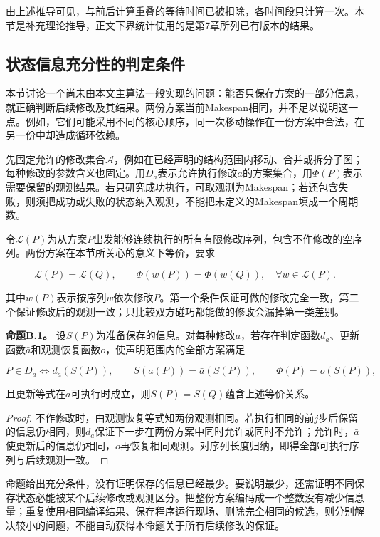 \documentclass[anonymous,notoc]{gmcm2026}
\begin{document}
由上述推导可见，与前后计算重叠的等待时间已被扣除，各时间段只计算一次。本节是补充理论推导，正文下界统计使用的是第7章所列已有版本的结果。

\subsection{状态信息充分性的判定条件}

本节讨论一个尚未由本文主算法一般实现的问题：能否只保存方案的一部分信息，就正确判断后续修改及其结果。两份方案当前Makespan相同，并不足以说明这一点。例如，它们可能采用不同的核心顺序，同一次移动操作在一份方案中合法，在另一份中却造成循环依赖。

先固定允许的修改集合\(\mathcal A\)，例如在已经声明的结构范围内移动、合并或拆分子图；每种修改的参数含义也固定。用\(D_a\)表示允许执行修改\(a\)的方案集合，用\(\Phi(P)\)表示需要保留的观测结果。若只研究成功执行，可取观测为Makespan；若还包含失败，则须把成功或失败的状态纳入观测，不能把未定义的Makespan填成一个周期数。

令\(\mathcal L(P)\)为从方案\(P\)出发能够连续执行的所有有限修改序列，包含不作修改的空序列。两份方案在本节所关心的意义下等价，要求

\[\mathcal L(P)=\mathcal L(Q),\qquad \Phi(w(P))=\Phi(w(Q)),\quad\forall w\in\mathcal L(P).\]

其中\(w(P)\)表示按序列\(w\)依次修改\(P\)。第一个条件保证可做的修改完全一致，第二个保证修改后的观测一致；只比较双方碰巧都能做的修改会漏掉第一类差别。

\textbf{命题B.1。} 设\(S(P)\)为准备保存的信息。对每种修改\(a\)，若存在判定函数\(d_a\)、更新函数\(\bar a\)和观测恢复函数\(o\)，使声明范围内的全部方案满足

\[P\in D_a\iff d_a(S(P)),\qquad S(a(P))=\bar a(S(P)),\qquad\Phi(P)=o(S(P)),\]

且更新等式在\(a\)可执行时成立，则\(S(P)=S(Q)\)蕴含上述等价关系。

\begin{proof} 不作修改时，由观测恢复等式知两份观测相同。若执行相同的前\(j\)步后保留的信息仍相同，则\(d_a\)保证下一步在两份方案中同时允许或同时不允许；允许时，\(\bar a\)使更新后的信息仍相同，\(o\)再恢复相同观测。对序列长度归纳，即得全部可执行序列与后续观测一致。\end{proof}

命题给出充分条件，没有证明保存的信息已经最少。要说明最少，还需证明不同保存状态必能被某个后续修改或观测区分。把整份方案编码成一个整数没有减少信息量；重复使用相同编译结果、保存程序运行现场、删除完全相同的候选，则分别解决较小的问题，不能自动获得本命题关于所有后续修改的保证。
\end{document}
